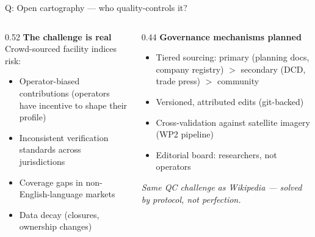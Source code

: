 \documentclass[aspectratio=169,11pt]{beamer}
\begin{document}
\begin{frame}[noframenumbering]{\enspace Q: Open cartography — who quality-controls it?}
\begin{columns}[T]
\begin{column}{0.52\textwidth}
  \small\textbf{The challenge is real}\\[0.4em]
  \footnotesize
  Crowd-sourced facility indices risk:
  \begin{itemize}
    \item Operator-biased contributions (operators have incentive to shape their profile)
    \item Inconsistent verification standards across jurisdictions
    \item Coverage gaps in non-English-language markets
    \item Data decay (closures, ownership changes)
  \end{itemize}
\end{column}
\begin{column}{0.44\textwidth}
  \small\textbf{Governance mechanisms planned}\\[0.4em]
  \footnotesize
  \begin{itemize}
    \item Tiered sourcing: primary (planning docs, company registry) $>$ secondary (DCD, trade press) $>$ community
    \item Versioned, attributed edits (git-backed)
    \item Cross-validation against satellite imagery (WP2 pipeline)
    \item Editorial board: researchers, not operators
  \end{itemize}
  \vspace{0.3em}
  \textcolor{dcgray}{\textit{Same QC challenge as Wikipedia — solved by protocol, not perfection.}}
\end{column}
\end{columns}
\end{frame}
\end{document}
